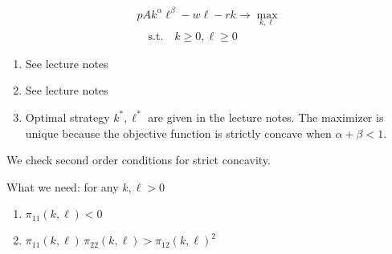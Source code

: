 \documentclass[letterpaper,10pt,english]{jupyterBook}
\begin{document}
\begin{equation*}
\begin{split}
p A k^{\alpha} \ell^{\beta} - w \ell - r k
\rightarrow \max_{k, \ell}\\
\quad \mathrm{s.t.} \quad
k \ge 0, \ell \ge 0
\end{split}
\end{equation*}\begin{enumerate}
%
\setcounter{enumi}{2}
\item {} 
\sphinxAtStartPar
See lecture notes

\item {} 
\sphinxAtStartPar
See lecture notes

\item {} 
\sphinxAtStartPar
Optimal strategy \(k^*, \ell^*\) are given in the lecture notes. The maximizer is unique because the objective function is strictly concave when \(\alpha+\beta < 1\).

\end{enumerate}

\sphinxAtStartPar
{}

\sphinxAtStartPar
We check second order conditions for strict concavity.

\sphinxAtStartPar
What we need: for any \(k, \ell > 0\)
\begin{enumerate}
%
\item {} 
\sphinxAtStartPar
\(\pi_{11}(k, \ell) < 0\)

\item {} 
\sphinxAtStartPar
\(\pi_{11}(k, \ell) \, \pi_{22}(k, \ell) >  \pi_{12}(k, \ell)^2\)

\end{enumerate}
\end{document}
